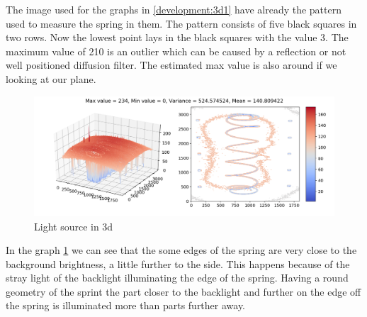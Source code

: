 The image used for the graphs in \ref{development:3d1} have already the pattern used to measure the spring in them. The pattern consists of five black squares in two rows. Now the lowest point lays in the black squares with the value 3. The maximum value of 210 is an outlier which can be caused by a reflection or not well positioned diffusion filter. The estimated max value is also around if we looking at our plane.
\begin{figure}[ht]
	\centering
	\includegraphics[trim=50 0 0 0,clip,width=1\linewidth]{3-development/backlight/3d4.png}
	\caption{Light source in 3d\label{development:3d4}}
\end{figure} 
In the graph \ref{development:3d4} we can see that the some edges of the spring are very close to the background brightness, a little further to the side. This happens because of the stray light of the backlight illuminating the edge of the spring. Having a round geometry of the sprint the part closer to the backlight and further on the edge off the spring is illuminated more than parts further away. \\
